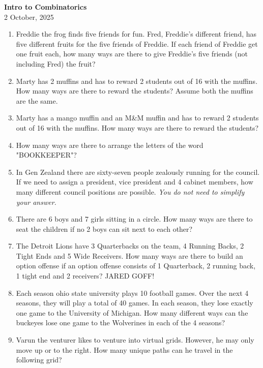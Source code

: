 \documentclass{article}
\begin{document}
\begin{center}
{\Large\bfseries Intro to Combinatorics}\\[0.25cm]
{\large 2 October, 2025}\\[1cm]
\end{center}

\begin{enumerate}[itemsep=2.85cm]
    \item Freddie the frog finds five friends for fun. Fred, Freddie's different friend, has five different fruits for the five friends of Freddie. If each friend of Freddie get one fruit each, how many ways are there to give Freddie's five friends (not including Fred) the fruit?
    \item Marty has 2 muffins and has to reward 2 students out of 16 with the muffins. How many ways are there to reward the students? Assume both the muffins are the same. 
    \item Marty has a mango muffin and an M\&M muffin and has to reward 2 students out of 16 with the muffins. How many ways are there to reward the students?
    \item How many ways are there to arrange the letters of the word "BOOKKEEPER"?
    \item In Gen Zealand there are sixty-seven people zealously running for the council. If we need to assign a president, vice president and 4 cabinet members, how many different council positions are possible. \textit{You do not need to simplify your answer.}
    \item There are 6 boys and 7 girls sitting in a circle. How many ways are there to seat the children if no 2 boys can sit next to each other?
    \item The Detroit Lions have 3 Quarterbacks on the team, 4 Running Backs, 2 Tight Ends and 5 Wide Receivers. How many ways are there to build an option offense if an option offense consists of 1 Quarterback, 2 running back, 1 tight end and 2 receivers? JARED GOFF!
    \item Each season ohio state university plays 10 football games. Over the next 4 seasons, they will play a total of 40 games. In each season, they lose exactly one game to the University of Michigan. How many different ways can the buckeyes lose one game to the Wolverines in each of the 4 seasons?
    \item Varun the venturer likes to venture into virtual grids. However, he may only move up or to the right. How many unique paths can he travel in the following grid?
    \begin{center}

\end{center}
\end{enumerate}
\end{document}
